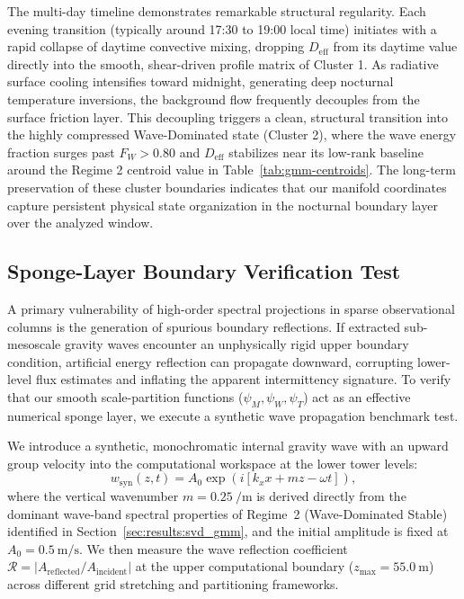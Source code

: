   The multi-day timeline demonstrates remarkable structural regularity. Each evening transition (typically around 17:30 to 19:00 local time) initiates with a rapid collapse of daytime convective mixing, dropping $D_{\mathrm{eff}}$ from its daytime value directly into the smooth, shear-driven profile matrix of Cluster 1. As radiative surface cooling intensifies toward midnight, generating deep nocturnal temperature inversions, the background flow frequently decouples from the surface friction layer. This decoupling triggers a clean, structural transition into the highly compressed Wave-Dominated state (Cluster 2), where the wave energy fraction surges past $F_W > 0.80$ and $D_{\mathrm{eff}}$ stabilizes near its low-rank baseline around the Regime 2 centroid value in Table~\ref{tab:gmm-centroids}. The long-term preservation of these cluster boundaries indicates that our manifold coordinates capture persistent physical state organization in the nocturnal boundary layer over the analyzed window.

\subsection{Sponge-Layer Boundary Verification Test}
\label{sec:results:sponge}

A primary vulnerability of high-order spectral projections in sparse observational columns is the generation of spurious boundary reflections. If extracted sub-mesoscale gravity waves encounter an unphysically rigid upper boundary condition, artificial energy reflection can propagate downward, corrupting lower-level flux estimates and inflating the apparent intermittency signature. To verify that our smooth scale-partition functions ($\psi_M, \psi_W, \psi_T$) act as an effective numerical sponge layer, we execute a synthetic wave propagation benchmark test.

We introduce a synthetic, monochromatic internal gravity wave with an upward group velocity into the computational workspace at the lower tower levels:
\begin{equation}
w_{\mathrm{syn}}(z, t) = A_0 \exp(i [k_x x + m z - \omega t]),
\label{eq:wave_syn}
\end{equation}
where the vertical wavenumber $m = \SI{0.25}{\per\meter}$ is derived directly from the dominant wave-band spectral properties of Regime~2 (Wave-Dominated Stable) identified in Section~\ref{sec:results:svd_gmm}, and the initial amplitude is fixed at $A_0 = \SI{0.5}{\meter\per\second}$. We then measure the wave reflection coefficient $\mathcal{R} = |A_{\mathrm{reflected}} / A_{\mathrm{incident}}|$ at the upper computational boundary ($z_{\max} = \SI{55.0}{\meter}$) across different grid stretching and partitioning frameworks.

